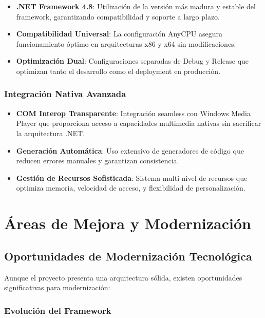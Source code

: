 \documentclass[a4paper]{article}
\begin{document}
\begin{itemize}
\item \textbf{.NET Framework 4.8}: Utilización de la versión más madura y estable del framework, garantizando compatibilidad y soporte a largo plazo.

\item \textbf{Compatibilidad Universal}: La configuración AnyCPU asegura funcionamiento óptimo en arquitecturas x86 y x64 sin modificaciones.

\item \textbf{Optimización Dual}: Configuraciones separadas de Debug y Release que optimizan tanto el desarrollo como el deployment en producción.
\end{itemize}

\subsubsection{Integración Nativa Avanzada}

\begin{itemize}
\item \textbf{COM Interop Transparente}: Integración seamless con Windows Media Player que proporciona acceso a capacidades multimedia nativas sin sacrificar la arquitectura .NET.

\item \textbf{Generación Automática}: Uso extensivo de generadores de código que reducen errores manuales y garantizan consistencia.

\item \textbf{Gestión de Recursos Sofisticada}: Sistema multi-nivel de recursos que optimiza memoria, velocidad de acceso, y flexibilidad de personalización.
\end{itemize}

\section{Áreas de Mejora y Modernización}

\subsection{Oportunidades de Modernización Tecnológica}

Aunque el proyecto presenta una arquitectura sólida, existen oportunidades significativas para modernización:

\subsubsection{Evolución del Framework}
\end{document}
